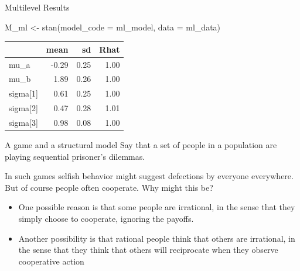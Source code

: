 \documentclass[
  11pt,
  ignorenonframetext,
]{beamer}
\newenvironment{Shaded}{\begin{snugshade}}{\end{snugshade}}
\newcommand{\AttributeTok}[1]{\textcolor[rgb]{0.40,0.45,0.13}{#1}}
\newcommand{\FunctionTok}[1]{\textcolor[rgb]{0.28,0.35,0.67}{#1}}
\newcommand{\NormalTok}[1]{\textcolor[rgb]{0.00,0.23,0.31}{#1}}
\newcommand{\OtherTok}[1]{\textcolor[rgb]{0.00,0.23,0.31}{#1}}
\providecommand{\tightlist}{%
  \setlength{\itemsep}{0pt}\setlength{\parskip}{0pt}}\usepackage{longtable,booktabs,array}
\begin{document}
\begin{frame}[fragile]{Multilevel Results}
\protect\hypertarget{multilevel-results}{}
\begin{Shaded}
\begin{Highlighting}[]
\NormalTok{M\_ml }\OtherTok{\textless{}{-}} \FunctionTok{stan}\NormalTok{(}\AttributeTok{model\_code =}\NormalTok{ ml\_model, }\AttributeTok{data =}\NormalTok{ ml\_data)}
\end{Highlighting}
\end{Shaded}

\begin{tabular}{l|r|r|r}
\hline
  & mean & sd & Rhat\\
\hline
mu\_a & -0.29 & 0.25 & 1.00\\
\hline
mu\_b & 1.89 & 0.26 & 1.00\\
\hline
sigma[1] & 0.61 & 0.25 & 1.00\\
\hline
sigma[2] & 0.47 & 0.28 & 1.01\\
\hline
sigma[3] & 0.98 & 0.08 & 1.00\\
\hline
\end{tabular}
\end{frame}

\begin{frame}{A game and a structural model}
\protect\hypertarget{a-game-and-a-structural-model}{}
Say that a set of people in a population are playing sequential
prisoner's dilemmas.

In such games selfish behavior might suggest defections by everyone
everywhere. But of course people often cooperate. Why might this be?

\begin{itemize}
\tightlist
\item
  One possible reason is that some people are irrational, in the sense
  that they simply choose to cooperate, ignoring the payoffs.
\item
  Another possibility is that rational people think that others are
  irrational, in the sense that they think that others will reciprocate
  when they observe cooperative action
\end{itemize}
\end{frame}
\end{document}

